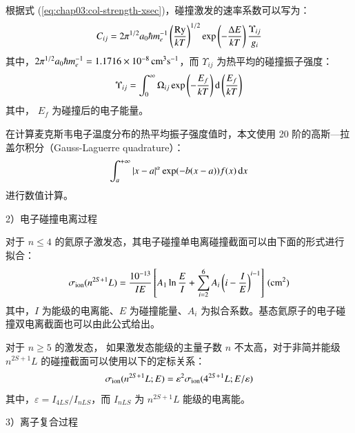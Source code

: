 根据式 (\ref{eq:chap03:col-strength-xsec})，碰撞激发的速率系数可以写为\cite{Burgess1992:collisionalstrength}：
\begin{equation}
    C_{ij}=2\pi^{1/2}a_0\hbar m_e^{-1}\left(\frac{\rm Ry}{kT}\right)^{1/2}\exp\left(-\frac{\Delta E}{kT}\right)\frac{\Upsilon_{ij}}{g_i}
\end{equation}
其中，$2\pi^{1/2}a_0\hbar m_e^{-1}=1.1716\times10^{-8}\,{\rm cm}^3{\rm s}^{-1}$，而 $\Upsilon_{ij}$ 为热平均的碰撞振子强度\cite{Seaton07071953}：
\begin{equation}
    \Upsilon_{ij}=\int_0^\infty\Omega_{ij}\exp\left(-\frac{E_f}{kT}\right){\rm d}\left(\frac{E_f}{kT}\right)
\end{equation}
其中， $E_f$ 为碰撞后的电子能量。

在计算麦克斯韦电子温度分布的热平均振子强度值时，本文使用 20 阶的高斯---拉盖尔积分（Gauss-Laguerre quadrature）\cite{GL:url:1,GL:url:2}：
\begin{equation}
    \int_a^{+\infty}|x-a|^\alpha\exp(-b(x-a))f(x)\,{\rm d}x
\end{equation}
进行数值计算。

2）电子碰撞电离过程

对于 $n\leq4$ 的氦原子激发态，其电子碰撞单电离碰撞截面可以由下面的形式进行拟合\cite{Ralchenko2008603,NIFS:DATA:059}：
\begin{equation}
    \sigma_{\rm ion}(n^{2S+1}L)=\frac{10^{-13}}{IE}\left[A_1\ln\frac{E}{I}+\sum_{i=2}^{6}A_i\left(i-\frac{I}{E}\right)^{i-1}\right]\,({\rm cm}^2)
\end{equation}
其中，$I$ 为能级的电离能、$E$ 为碰撞能量、$A_i$ 为拟合系数。基态氦原子的电子碰撞双电离截面也可以由此公式给出。

对于 $n\geq5$ 的激发态，%
如果激发态能级的主量子数 $n$ 不太高，对于非简并能级 $n^{2S+1}L$ 的碰撞截面可以使用以下的定标关系：
\begin{equation}
    \sigma_{\rm ion}(n^{2S+1}L;E)=\varepsilon^2\sigma_{\rm ion}(4^{2S+1}L;E/\varepsilon)
\end{equation}
其中，$\varepsilon=I_{4LS}/I_{nLS}$，而 $I_{nLS}$ 为 $n^{2S+1}L$ 能级的电离能。

3）离子复合过程

